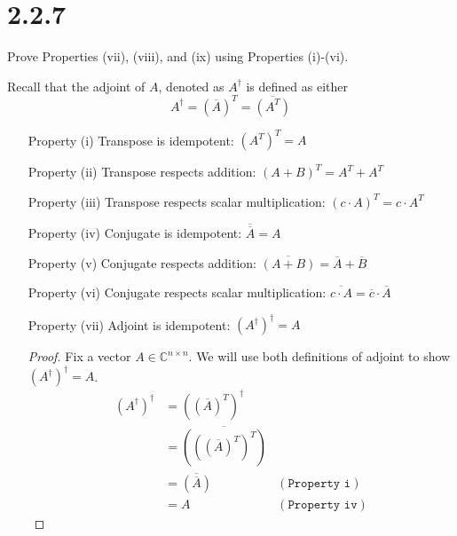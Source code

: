 \documentclass[11pt]{article}
\begin{document}

\section{2.2.7} Prove Properties (vii), (viii), and (ix) using Properties (i)-(vi).

Recall that the adjoint of $A$, denoted as $A^{\dagger}$ is defined as either
$$A^{\dagger} = (\overline{A})^T = \overline{(A^T)}$$

\begin{enumerate}
	\item[Property (i)] Transpose is idempotent: 
		$(A^T)^T = A$
	\item[Property (ii)] Transpose respects addition: 
		$(A+B)^T = A^T + A^T$
	\item[Property (iii)] Transpose respects scalar multiplication: 
		$(c \cdot A)^T = c \cdot A^T$
	\item[Property (iv)] Conjugate is idempotent: 
		$\overline{\overline{A}} = A$
	\item[Property (v)] Conjugate respects addition:
		$\overline{(A+B)} = \overline{A} + \overline{B}$
	\item[Property (vi)] Conjugate respects scalar multiplication: 
		$\overline{c \cdot A} = \overline{c} \cdot \overline{A}$
	\item[Property (vii)] Adjoint is idempotent: 
		$(A^{\dagger})^{\dagger} = A$ 
\begin{proof}
	Fix a vector $A \in \mathbb{C}^{n \times n}$. We will use both definitions of 
	adjoint to show $(A^{\dagger})^{\dagger} = A$. 
	\begin{align*}
		(A^{\dagger})^{\dagger} &= ((\overline{A})^T)^{\dagger}  \\
		                        &= \overline{(((\overline{A})^T)^T)} \\
					&= \overline{(\overline{A})} & (\texttt{Property i}) \\
					&= A  & (\texttt{Property iv})
	\end{align*}
	\end{proof}
		
	\newpage


\end{enumerate}
\end{document}
